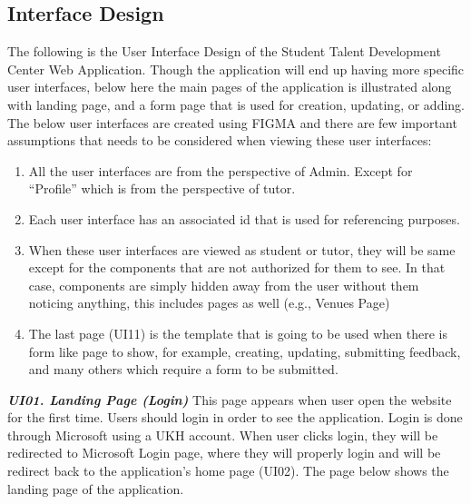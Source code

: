 \subsection{Interface Design}
\begin{justify}
    The following is the User Interface Design of the Student Talent Development Center Web Application. Though the application will end up having more specific user interfaces, below here the main pages of the application is illustrated along with landing page, and a form page that is used for creation, updating, or adding. The below user interfaces are created using FIGMA and there are few important assumptions that needs to be considered when viewing these user interfaces:

    \begin{enumerate}
        \item All the user interfaces are from the perspective of Admin. Except for “Profile” which is from the perspective of tutor.
        \item Each user interface has an associated id that is used for referencing purposes.
        \item When these user interfaces are viewed as student or tutor, they will be same except for the components that are not authorized for them to see. In that case, components are simply hidden away from the user without them noticing anything, this includes pages as well (e.g., Venues Page)
        \item The last page (UI11) is the template that is going to be used when there is form like page to show, for example, creating, updating, submitting feedback, and many others which require a form to be submitted.
    \end{enumerate}
    \clearpage

    \noindent\textbf{\textit{UI01. Landing Page (Login)}}\newendline
    This page appears when user open the website for the first time. Users should login in order to see the application. Login is done through Microsoft using a UKH account. When user clicks login, they will be redirected to Microsoft Login page, where they will properly login and will be redirect back to the application’s home page (UI02). The page below shows the landing page of the application.\\


\end{justify}
